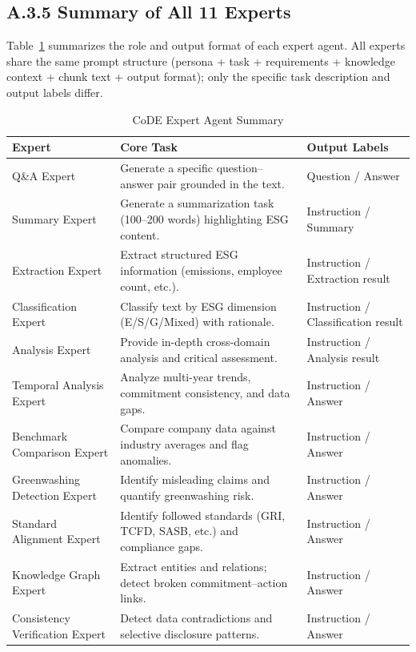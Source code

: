 \subsection*{A.3.5 Summary of All 11 Experts}
Table~\ref{tab:experts} summarizes the role and output format of each expert agent. All experts share the same prompt structure (persona + task + requirements + knowledge context + chunk text + output format); only the specific task description and output labels differ.

\begin{table}[h]
\centering
\caption{CoDE Expert Agent Summary}
\label{tab:experts}
\small
\begin{tabular}{@{}p{3.5cm}p{5.8cm}p{2.5cm}@{}}
\toprule
\textbf{Expert} & \textbf{Core Task} & \textbf{Output Labels} \\
\midrule
Q\&A Expert & Generate a specific question--answer pair grounded in the text. & Question / Answer \\
Summary Expert & Generate a summarization task (100--200 words) highlighting ESG content. & Instruction / Summary \\
Extraction Expert & Extract structured ESG information (emissions, employee count, etc.). & Instruction / Extraction result \\
Classification Expert & Classify text by ESG dimension (E/S/G/Mixed) with rationale. & Instruction / Classification result \\
Analysis Expert & Provide in-depth cross-domain analysis and critical assessment. & Instruction / Analysis result \\
Temporal Analysis Expert & Analyze multi-year trends, commitment consistency, and data gaps. & Instruction / Answer \\
Benchmark Comparison Expert & Compare company data against industry averages and flag anomalies. & Instruction / Answer \\
Greenwashing Detection Expert & Identify misleading claims and quantify greenwashing risk. & Instruction / Answer \\
Standard Alignment Expert & Identify followed standards (GRI, TCFD, SASB, etc.) and compliance gaps. & Instruction / Answer \\
Knowledge Graph Expert & Extract entities and relations; detect broken commitment--action links. & Instruction / Answer \\
Consistency Verification Expert & Detect data contradictions and selective disclosure patterns. & Instruction / Answer \\
\bottomrule
\end{tabular}
\end{table}

